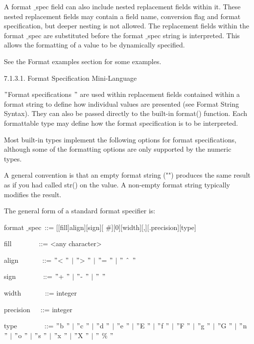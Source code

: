 A format $  \_  $spec field can also include nested replacement fields within it. These nested replacement fields may contain a field name, conversion flag and format specification, but deeper nesting is not allowed. The replacement fields within the format $  \_  $spec are substituted before the format $  \_  $spec string is interpreted. This allows the formatting of a value to be dynamically specified. \par
See the Format examples section for some examples. \par
7.1.3.1. Format Specification Mini-Language \par
 $ " $Format specifications $ " $ are used within replacement fields contained within a format string to define how individual values are presented (see Format String Syntax). They can also be passed directly to the built-in format() function. Each formattable type may define how the format specification is to be interpreted. \par
Most built-in types implement the following options for format specifications, although some of the formatting options are only supported by the numeric types. \par
A general convention is that an empty format string ("") produces the same result as if you had called str() on the value. A non-empty format string typically modifies the result. \par
The general form of a standard format specifier is: \par
format $  \_  $spec~::=  [[fill]align][sign][ $  \#  $][0][width][,][.precision][type] \par
fill~~~~~~~~::=  <any character> \par
align~~~~~~~::=   $ " $< $ " $  $  \vert  $  $ " $> $ " $  $  \vert  $  $ " $= $ " $  $  \vert  $  $ " $ $  \string^  $ $ " $ \par
sign~~~~~~~~::=   $ " $+ $ " $  $  \vert  $  $ " $- $ " $  $  \vert  $  $ " $  $ " $ \par
width~~~~~~~::=  integer \par
precision~~~::=  integer \par
type~~~~~~~~::=   $ " $b $ " $  $  \vert  $  $ " $c $ " $  $  \vert  $  $ " $d $ " $  $  \vert  $  $ " $e $ " $  $  \vert  $  $ " $E $ " $  $  \vert  $  $ " $f $ " $  $  \vert  $  $ " $F $ " $  $  \vert  $  $ " $g $ " $  $  \vert  $  $ " $G $ " $  $  \vert  $  $ " $n $ " $  $  \vert  $  $ " $o $ " $  $  \vert  $  $ " $s $ " $  $  \vert  $  $ " $x $ " $  $  \vert  $  $ " $X $ " $  $  \vert  $  $ " $ $  \%  $ $ " $ \par
